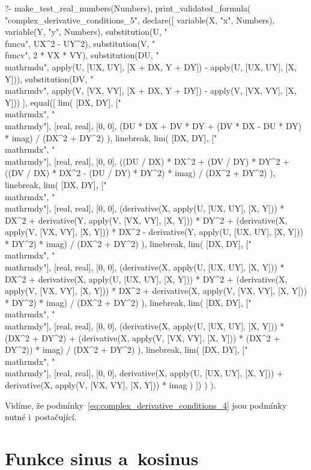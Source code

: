 \begin{prolog}
?-	make_test_real_numbers(Numbers),
	print_validated_formula(
		"complex_derivative_conditions_5",
		declare([
			variable(X, "x", Numbers),
			variable(Y, "y", Numbers),
			substitution(U, "\\func{u}", UX^2 - UY^2),
			substitution(V, "\\func{v}", 2 * VX * VY),
			substitution(DU, "\\mathrm{d}u", apply(U, [UX, UY], [X + DX, Y + DY]) - apply(U, [UX, UY], [X, Y])),
			substitution(DV, "\\mathrm{d}v", apply(V, [VX, VY], [X + DX, Y + DY]) - apply(V, [VX, VY], [X, Y]))
		],
			equal([
				lim(
					[DX, DY], ["\\mathrm{d}x", "\\mathrm{d}y"], [real, real], [0, 0],
					(DU * DX + DV * DY + (DV * DX - DU * DY) * imag) / (DX^2 + DY^2)
				),
				linebreak,
				lim(
					[DX, DY], ["\\mathrm{d}x", "\\mathrm{d}y"], [real, real], [0, 0],
					((DU / DX) * DX^2 + (DV / DY) * DY^2 + ((DV / DX) * DX^2 - (DU / DY) * DY^2) * imag) / (DX^2 + DY^2)
				),
				linebreak,
				lim(
					[DX, DY], ["\\mathrm{d}x", "\\mathrm{d}y"], [real, real], [0, 0],
					(derivative(X, apply(U, [UX, UY], [X, Y])) * DX^2 + derivative(Y, apply(V, [VX, VY], [X, Y])) * DY^2 + (derivative(X, apply(V, [VX, VY], [X, Y])) * DX^2 - derivative(Y, apply(U, [UX, UY], [X, Y])) * DY^2) * imag) / (DX^2 + DY^2)
				),
				linebreak,
				lim(
					[DX, DY], ["\\mathrm{d}x", "\\mathrm{d}y"], [real, real], [0, 0],
					(derivative(X, apply(U, [UX, UY], [X, Y])) * DX^2 + derivative(X, apply(U, [UX, UY], [X, Y])) * DY^2 + (derivative(X, apply(V, [VX, VY], [X, Y])) * DX^2 + derivative(X, apply(V, [VX, VY], [X, Y])) * DY^2) * imag) / (DX^2 + DY^2)
				),
				linebreak,
				lim(
					[DX, DY], ["\\mathrm{d}x", "\\mathrm{d}y"], [real, real], [0, 0],
					(derivative(X, apply(U, [UX, UY], [X, Y])) * (DX^2 + DY^2) + (derivative(X, apply(V, [VX, VY], [X, Y])) * (DX^2 + DY^2)) * imag) / (DX^2 + DY^2)
				),
				linebreak,
				lim(
					[DX, DY], ["\\mathrm{d}x", "\\mathrm{d}y"], [real, real], [0, 0],
					derivative(X, apply(U, [UX, UY], [X, Y])) + derivative(X, apply(V, [VX, VY], [X, Y])) * imag
				)
			])
		)
	).
\end{prolog}

Vidíme, že podmínky~\eqref{eq:complex_derivative_conditions_4} jsou podmínky nutné i~postačující.

\section{Funkce sinus a~kosinus}
